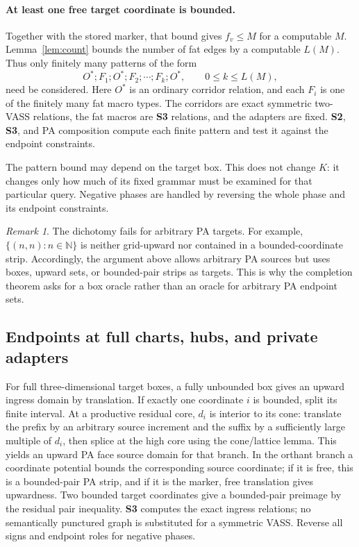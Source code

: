 \documentclass[11pt,a4paper]{article}
\theoremstyle{remark}
\newtheorem*{remark}{Remark}
\newcommand{\N}{\mathbb N}
\begin{document}
\paragraph{At least one free target coordinate is bounded.}
Together with the stored marker, that bound gives \(f_v\le M\) for
a computable \(M\). Lemma~\ref{lem:count} bounds the number of fat
edges by a computable \(L(M)\). Thus only finitely many patterns of
the form
\begin{equation}
 O^*;F_1;O^*;F_2;\cdots;F_k;O^*,
 \qquad 0\le k\le L(M),\label{eq:finite-patterns}
\end{equation}
need be considered. Here \(O^*\) is an ordinary corridor relation,
and each \(F_i\) is one of the finitely many fat macro types. The
corridors are exact symmetric two-VASS relations, the fat macros are
\textbf{S3} relations, and the adapters are fixed. \textbf{S2},
\textbf{S3}, and PA composition compute each finite pattern and test
it against the endpoint constraints.

The pattern bound may depend on the target box. This does not change
\(K\): it changes only how much of its fixed grammar must be examined
for that particular query. Negative phases are handled by reversing
the whole phase and its endpoint constraints.

\begin{remark}
The dichotomy fails for arbitrary PA targets. For example,
\(\{(n,n):n\in\N\}\) is neither grid-upward nor contained in a
bounded-coordinate strip. Accordingly, the argument above allows
arbitrary PA sources but uses boxes, upward sets, or bounded-pair
strips as targets. This is why the completion theorem asks for a box
oracle rather than an oracle for arbitrary PA endpoint sets.
\end{remark}

\subsection{Endpoints at full charts, hubs, and private adapters}

For full three-dimensional target boxes, a fully unbounded box gives an upward ingress domain by translation. If exactly one coordinate \(i\) is bounded, split its finite interval. At a productive residual core, \(d_i\) is interior to its cone: translate the prefix by an arbitrary source increment and the suffix by a sufficiently large multiple of \(d_i\), then splice at the high core using the cone/lattice lemma. This yields an upward PA face source domain for that branch. In the orthant branch a coordinate potential bounds the corresponding source coordinate; if it is free, this is a bounded-pair PA strip, and if it is the marker, free translation gives upwardness. Two bounded target coordinates give a bounded-pair preimage by the residual pair inequality. \textbf{S3} computes the exact ingress relations; no semantically punctured graph is substituted for a symmetric VASS. Reverse all signs and endpoint roles for negative phases.
\end{document}
